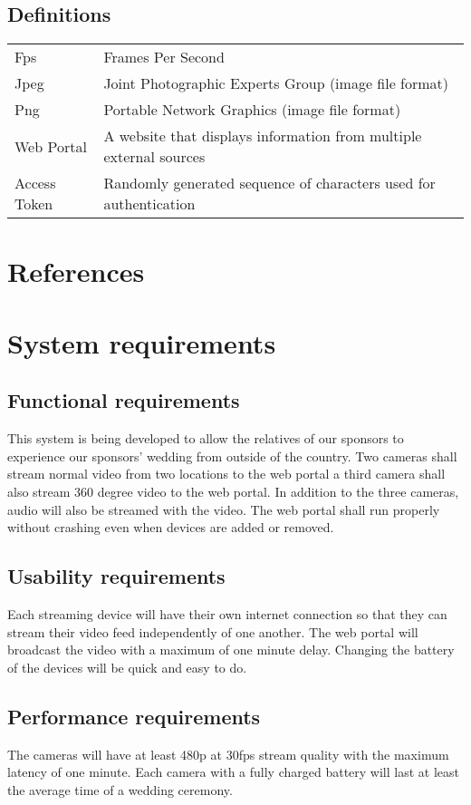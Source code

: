 \documentclass[onecolumn, draftclsnofoot,10pt, compsoc]{IEEEtran}
\begin{document}
    \subsection{Definitions}
        \begin{tabular}{ll}
         Fps & Frames Per Second \\ 
         Jpeg & Joint Photographic Experts Group (image file format) \\ 
         Png & Portable Network Graphics (image file format) \\
         Web Portal & A website that displays information from multiple external sources \\ 
         Access Token & Randomly generated sequence of characters used for authentication \\
        \end{tabular}

    
\section{References}

\section{System requirements}
    \subsection{Functional requirements}
     This system is being developed to allow the relatives of our sponsors to experience our sponsors' wedding from outside of the country.
    Two cameras shall stream normal video from two locations to the web portal a third camera shall also stream 360 degree video to the web portal. In addition to the three cameras, audio will also be streamed with the video.
    The web portal shall run properly without crashing even when devices are added or removed.
    
    \subsection{Usability requirements}
    Each streaming device will have their own internet connection so that they can stream their video feed independently of one another.
    The web portal will broadcast the video with a maximum of one minute delay. Changing the battery of the devices will be quick and easy to do. 
    
    \subsection{Performance requirements}
    The cameras will have at least 480p at 30fps stream quality with the maximum latency of one minute. 
    Each camera with a fully charged battery will last at least the average time of a wedding ceremony. 
 
\end{document}
